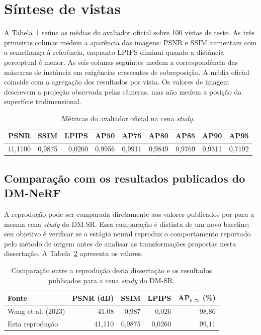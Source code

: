 \section{Síntese de vistas}

A Tabela~\ref{tab:metricas_neurais} reúne as médias do avaliador oficial sobre 100 vistas de teste. As três primeiras colunas medem a aparência das imagens: PSNR e SSIM aumentam com a semelhança à referência, enquanto LPIPS diminui quando a distância perceptual é menor. As seis colunas seguintes medem a correspondência das máscaras de instância em exigências crescentes de sobreposição. A média oficial coincide com a agregação dos resultados por vista. Os valores de imagem descrevem a projeção observada pelas câmeras, mas não medem a posição da superfície tridimensional.

\begin{table}[H]
\centering
\small
\caption{Métricas do avaliador oficial na cena \textit{study}.}
\label{tab:metricas_neurais}
\begin{tabular}{rrrrrrrrr}
\toprule
PSNR & SSIM & LPIPS & AP50 & AP75 & AP80 & AP85 & AP90 & AP95 \\
\midrule
41,1100 & 0,9875 & 0,0260 & 0,9956 & 0,9911 & 0,9849 & 0,9769 & 0,9311 & 0,7192 \\
\bottomrule
\end{tabular}
\end{table}

\subsection{Comparação com os resultados publicados do DM-NeRF}

A reprodução pode ser comparada diretamente aos valores publicados por \citet{wang2023dmnerf} para a mesma cena \textit{study} do DM-SR. Essa comparação é distinta de um novo baseline: seu objetivo é verificar se o estágio neural reproduz o comportamento reportado pelo método de origem antes de analisar as transformações propostas nesta dissertação. A Tabela~\ref{tab:repro_dmnerf} apresenta os valores.

\begin{table}[H]
\centering
\small
\caption{Comparação entre a reprodução desta dissertação e os resultados publicados para a cena \textit{study} do DM-SR.}
\label{tab:repro_dmnerf}
\begin{tabular}{lrrrr}
\toprule
\textbf{Fonte} & \textbf{PSNR (dB)} & \textbf{SSIM} & \textbf{LPIPS} & \textbf{AP$_{0,75}$ (\%)} \\
\midrule
Wang et al. (2023) & 41,08 & 0,987 & 0,026 & 98,86 \\
Esta reprodução & 41,110 & 0,9875 & 0,0260 & 99,11 \\
\bottomrule
\end{tabular}
\end{table}

